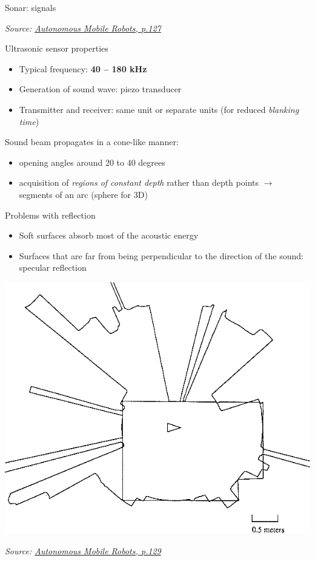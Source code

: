 \documentclass[compress]{beamer}
\newcommand{\source}[2]{{\tiny\it Source: \href{#1}{#2}}}
\begin{document}
\begin{frame}{Sonar: signals}

    \source{https://books.google.co.uk/books?id=4of6AQAAQBAJ&pg=PA127}{Autonomous Mobile Robots, p.127}
\end{frame}

\begin{frame}{Ultrasonic sensor properties}

    \begin{itemize}
        \item Typical frequency: \textbf{40 -- 180 kHz}
        \item Generation of sound wave: piezo transducer
        \item Transmitter and receiver: same unit or separate units (for reduced \emph{blanking time})
    \end{itemize}

    Sound beam propagates in a cone-like manner:

    \begin{itemize}
        \item opening angles around 20 to 40 degrees
        \item acquisition of \emph{regions of constant depth} rather than depth
            points $\rightarrow$ segments of an arc (sphere for 3D)
    \end{itemize}

\end{frame}

\begin{frame}{Problems with reflection}

    \begin{itemize}

        \item Soft surfaces absorb most of the acoustic energy
        \item Surfaces that are far from being perpendicular to the direction of
              the sound: specular reflection
    \end{itemize}

    \begin{center}
        \includegraphics[width=0.55\linewidth]{us_scan}

        \source{https://books.google.co.uk/books?id=4of6AQAAQBAJ&pg=PA129}{Autonomous Mobile Robots, p.129}
    \end{center}
\end{frame}
\end{document}
